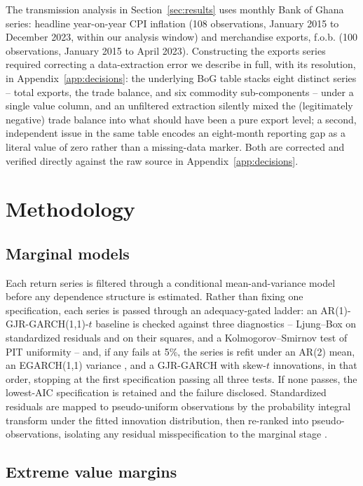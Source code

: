 \documentclass[final,3p,times,authoryear]{elsarticle}
\begin{document}
The transmission analysis in Section~\ref{sec:results} uses monthly
Bank of Ghana series: headline year-on-year CPI inflation (108
observations, January 2015 to December 2023, within our analysis
window) and merchandise exports, f.o.b. (100 observations, January 2015
to April 2023). Constructing the exports series required correcting a
data-extraction error we describe in full, with its resolution, in
Appendix~\ref{app:decisions}: the underlying BoG table stacks eight
distinct series -- total exports, the trade balance, and six commodity
sub-components -- under a single value column, and an unfiltered
extraction silently mixed the (legitimately negative) trade balance into
what should have been a pure export level; a second, independent issue
in the same table encodes an eight-month reporting gap as a literal
value of zero rather than a missing-data marker. Both are corrected and
verified directly against the raw source in Appendix~\ref{app:decisions}.

\section{Methodology}
\label{sec:methodology}

\subsection{Marginal models}
\label{sec:marginals}

Each return series is filtered through a conditional mean-and-variance
model before any dependence structure is estimated. Rather than fixing
one specification, each series is passed through an adequacy-gated
ladder: an AR(1)-GJR-GARCH(1,1)-$t$ baseline \citep{bollerslev1986,glosten1993}
is checked against three diagnostics -- Ljung--Box on standardized
residuals and on their squares, and a Kolmogorov--Smirnov test of PIT
uniformity -- and, if any fails at 5\%, the series is refit under an
AR(2) mean, an EGARCH(1,1) variance \citep{nelson1991}, and a GJR-GARCH
with skew-$t$ innovations, in that order, stopping at the first
specification passing all three tests. If none passes, the lowest-AIC
specification is retained and the failure disclosed. Standardized
residuals are mapped to pseudo-uniform observations by the probability
integral transform under the fitted innovation distribution, then
re-ranked into pseudo-observations, isolating any residual
misspecification to the marginal stage \citep{genest1995,joe2005}.

\subsection{Extreme value margins}
\end{document}
